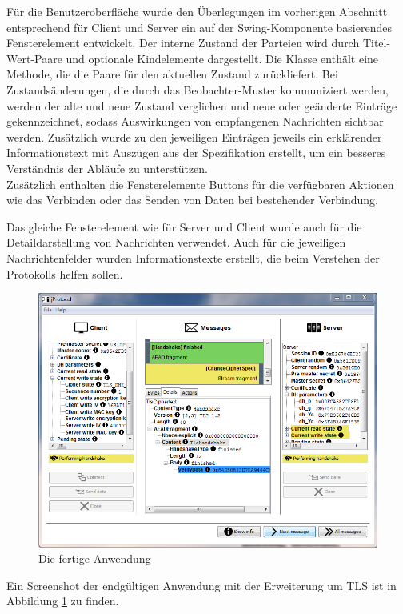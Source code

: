 Für die Benutzeroberfläche wurde den Überlegungen im vorherigen Abschnitt entsprechend für Client und Server ein auf der Swing-Komponente  basierendes Fensterelement entwickelt. Der interne Zustand der Parteien wird durch Titel-Wert-Paare und optionale Kindelemente dargestellt. Die Klasse  enthält eine Methode, die die Paare für den aktuellen Zustand zurückliefert. Bei Zustandsänderungen, die durch das Beobachter-Muster kommuniziert werden, werden der alte und neue Zustand verglichen und neue oder geänderte Einträge gekennzeichnet, sodass Auswirkungen von empfangenen Nachrichten sichtbar werden. Zusätzlich wurde zu den jeweiligen Einträgen jeweils ein erklärender Informationstext mit Auszügen aus der Spezifikation erstellt, um ein besseres Verständnis der Abläufe zu unterstützen.\\
Zusätzlich enthalten die Fensterelemente Buttons für die verfügbaren Aktionen wie das Verbinden oder das Senden von Daten bei bestehender Verbindung.

Das gleiche Fensterelement wie für Server und Client wurde auch für die Detaildarstellung von Nachrichten verwendet. Auch für die jeweiligen Nachrichtenfelder wurden Informationstexte erstellt, die beim Verstehen der Protokolls helfen sollen.

\begin{figure}
	\centering
	\includegraphics[scale=0.7]{Diagrams/ScreenshotTLS.png} 
	\caption{Die fertige Anwendung}
	\label{fig_application_screenshot}
\end{figure}

Ein Screenshot der endgültigen Anwendung mit der Erweiterung um TLS ist in Abbildung \ref{fig_application_screenshot} zu finden.


